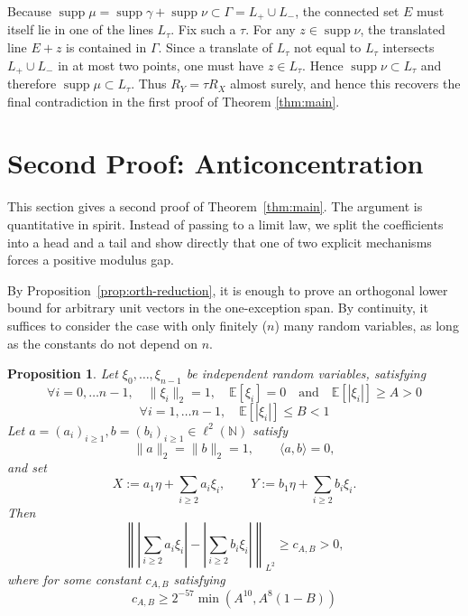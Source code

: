 \documentclass[11pt]{amsart}
\numberwithin{equation}{section}
\newtheorem{proposition}[theorem]{Proposition}
\theoremstyle{definition}
\theoremstyle{remark}
\newcommand{\E}{\mathbb E}
\newcommand{\N}{\mathbb N}
\newcommand{\supp}{\operatorname{supp}}
\newcommand{\norm}[1]{\lVert #1 \rVert}
\newcommand{\ip}[2]{\langle #1,#2\rangle}
\begin{document}
Because $\supp\mu=\supp\gamma+\supp\nu\subset\Gamma=L_+\cup L_-$, the
connected set $E$ must itself lie in one of the lines $L_\tau$.  Fix such a
$\tau$.  For any $z\in\supp\nu$, the translated line $E+z$ is contained in
$\Gamma$.  Since a translate of $L_\tau$ not equal to $L_\tau$ intersects
$L_+\cup L_-$ in at most two points, one must have $z\in L_\tau$.  Hence
$\supp\nu\subset L_\tau$ and therefore $\supp\mu\subset L_\tau$.  Thus
$R_Y=\tau R_X$ almost surely, and hence this recovers the final contradiction in the first proof of Theorem \ref{thm:main}. 

\section{Second Proof: Anticoncentration}\label{sec:quant-proof}

This section gives a second proof of Theorem~\ref{thm:main}.  The argument is
quantitative in spirit.  Instead of passing to a limit law, we split the
coefficients into a head and a tail and show directly that one of two explicit
mechanisms forces a positive modulus gap.

By Proposition~\ref{prop:orth-reduction}, it is enough to prove an orthogonal
lower bound for arbitrary unit vectors in the one-exception span. By continuity, it suffices to consider the case with only finitely ($n$) many random variables, as long as the constants do not depend on $n$.
\begin{proposition}
    Let $\xi_0,\dots, \xi_{n-1}$ be independent random variables, satisfying
    \[
    \forall i = 0, \dots {n-1},\quad \|\xi_i\|_2 = 1, \quad \mathbb E[\xi_i] = 0 \quad  \text{and} \quad \E[|\xi_i|] \ge A>0 
    \]
    \[
    \forall i = 1,\dots n-1, \quad \E[|\xi_i|] \le B<1 
    \]
    Let
    $a=(a_i)_{i\ge1}, b=(b_i)_{i\ge1}\in \ell^2(\N)$ satisfy
    \[
    \norm{a}_2=\norm{b}_2=1,
    \qquad
    \ip{a}{b}=0,
    \]
    and set
    \[
    X:=a_1\eta+\sum_{i\ge2} a_i\xi_i,
    \qquad
    Y:=b_1\eta+\sum_{i\ge2} b_i\xi_i.
    \]
    Then 
    \[
    \left\||\sum_{i\ge2} a_i\xi_i|-|\sum_{i\ge2} b_i\xi_i|\right \|_{L^2}\ge c_{A,B}>0,
    \]
    where for some constant $c_{A,B}$ satisfying
    \[
    c_{A,B}
    \ge 
    2^{-57}
    \min \left(A^{10},A^{8} (1-B)\right)
    \]
\end{proposition}

\end{document}
